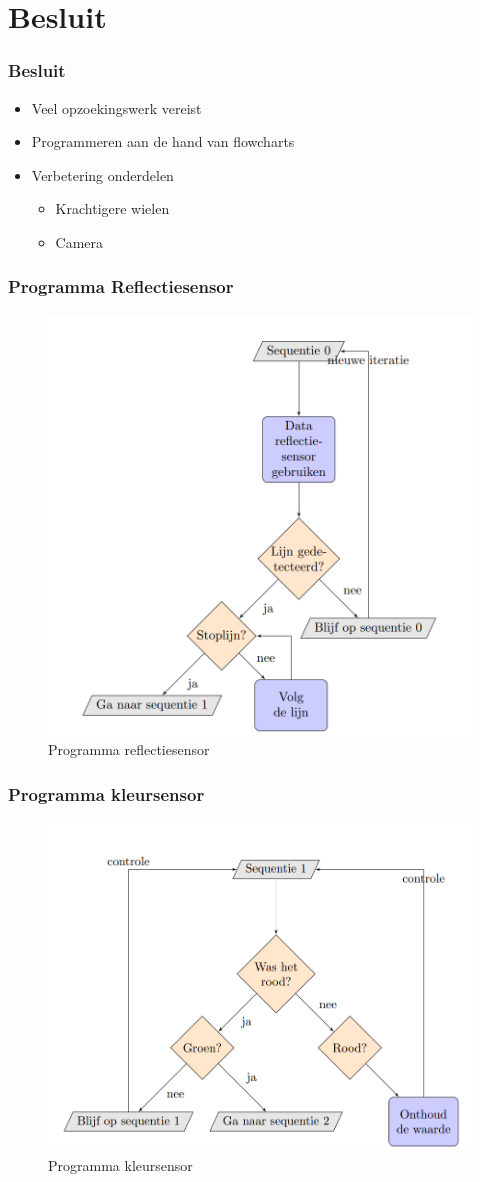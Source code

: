 \documentclass
   [kulak] %
   {kulakbeamer}
\begin{document}
\section{Besluit}
\begin{frame}
\frametitle{Besluit}
	\begin{itemize}
	\item Veel opzoekingswerk vereist
	\item Programmeren aan de hand van flowcharts
	\item Verbetering onderdelen
		\begin{itemize}
		\item Krachtigere wielen
		\item Camera
		\end{itemize}
\end{itemize}
\end{frame}




\begin{frame}
	\frametitle{Programma Reflectiesensor}
	\begin{figure}
		\centering
		\includegraphics[width=.5\textwidth,]{flowchart_sequentie0}
		\caption{Programma reflectiesensor}
	\end{figure}
\end{frame}

\begin{frame}
	\frametitle{Programma kleursensor}
	\begin{figure}
		\centering
		\includegraphics[width=.7\textwidth]{flowchart_sequentie1}
		\caption{Programma kleursensor}
	\end{figure}
\end{frame}
\end{document}
